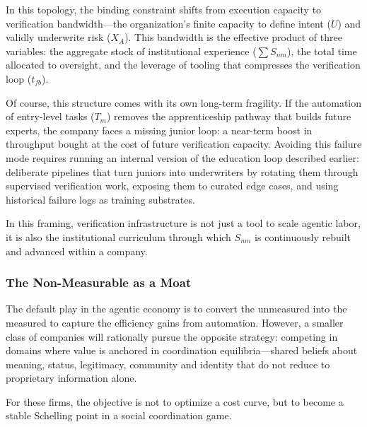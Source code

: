\documentclass[12pt, letter]{article}
\begin{document}
In this topology, the binding constraint shifts from execution capacity to verification bandwidth—the organization's finite capacity to define intent ($U$) and validly underwrite risk ($X_A$). This bandwidth is the effective product of three variables: the aggregate stock of institutional experience ($\sum S_{nm}$), the total time allocated to oversight, and the leverage of tooling that compresses the verification loop ($t_{fb}$).

Of course, this structure comes with its own long-term fragility. If the automation of entry-level tasks ($T_m$) removes the apprenticeship pathway that builds future experts, the company faces a missing junior loop: a near-term boost in throughput bought at the cost of future verification capacity. Avoiding this failure mode requires running an internal version of the education loop described earlier: deliberate pipelines that turn juniors into underwriters by rotating them through supervised verification work, exposing them to curated edge cases, and using historical failure logs as training substrates. 

In this framing, verification infrastructure is not just a tool to scale agentic labor, it is also the institutional curriculum through which $S_{nm}$ is continuously rebuilt and advanced within a company.


\subsubsection{The Non-Measurable as a Moat}

The default play in the agentic economy is to convert the unmeasured into the measured to capture the efficiency gains from automation. However, a smaller class of companies will rationally pursue the opposite strategy: competing in domains where value is anchored in coordination equilibria---shared beliefs about meaning, status, legitimacy, community and identity that do not reduce to proprietary information alone.

For these firms, the objective is not to optimize a cost curve, but to become a stable Schelling point in a social coordination game.
\end{document}
